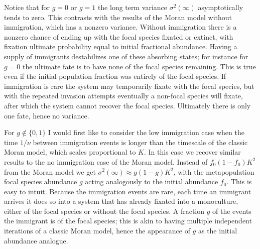 Notice that for $g=0$ or $g=1$ the long term variance $\sigma^2(\infty)$ asymptotically tends to zero. 
This contrasts with the results of the Moran model without immigration, which has a nonzero variance. 
Without immigration there is a nonzero chance of ending up with the focal species fixated or extinct, with fixation ultimate probability equal to initial fractional abundance. 
Having a supply of immigrants destabilizes one of these absorbing states; for instance for $g=0$ the ultimate fate is to have none of the focal species remaining. %
This is true even if the initial population fraction was entirely of the focal species. %
If immigration is rare the system may temporarily fixate with the focal species, but with the repeated invasion attempts eventually a non-focal species will fixate, after which the system cannot recover the focal species. 
Ultimately there is only one fate, hence no variance. 

For $g\notin \{0,1\}$ I would first like to consider the low immigration case when the time $1/\nu$ between immigration events is longer than the timescale of the classic Moran model, which scales proportional to $K$. 
In this case we recover similar results to the no immigration case of the Moran model. 
Instead of $f_0(1-f_0)K^2$ from the Moran model we get $\sigma^2(\infty) \approx g(1-g) K^2$, with the metapopulation focal species abundance $g$ acting analogously to the initial abundance $f_0$. 
This is easy to intuit. Because the immigration events are rare, each time an immigrant arrives it does so into a system that has already fixated into a monoculture, either of the focal species or without the focal species. 
A fraction $g$ of the events the immigrant is of the focal species; this is akin to having multiple independent iterations of a classic Moran model, hence the appearance of $g$ as the initial abundance analogue. %

